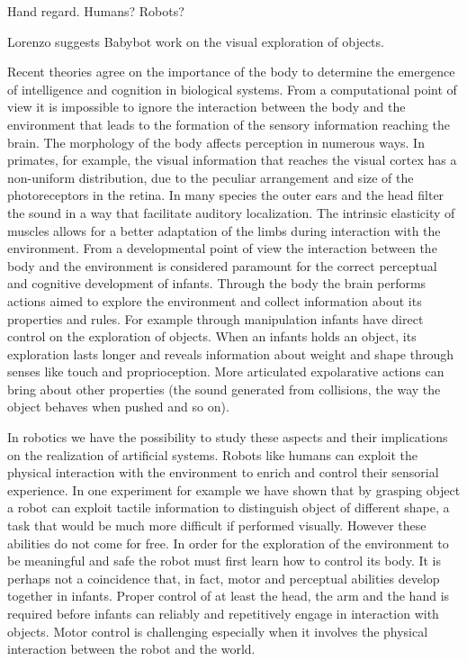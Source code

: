 
Hand regard.  Humans?  Robots?

Lorenzo suggests Babybot work on the visual exploration of objects.

Recent theories agree on the importance of the body to determine the emergence of intelligence and cognition in biological systems. 
From a computational point of view it is impossible to ignore the interaction between the body and the environment that leads to the formation of the sensory information reaching the brain. 
The morphology of the body affects perception in numerous ways. In primates, for example, the visual information that reaches the visual cortex has a non-uniform distribution, due to the peculiar arrangement and size of the photoreceptors in the retina. In many species the outer ears and the head filter the sound in a way that facilitate auditory localization. The intrinsic elasticity of muscles allows for a better adaptation of the limbs during interaction with the environment.
From a developmental point of view the interaction between the body and the environment is considered paramount for the correct perceptual and cognitive development of infants. 
Through the body the brain performs actions aimed to explore the environment and collect information about its properties and rules. For example through manipulation infants have direct control on the exploration of objects. When an infants holds an object, its exploration lasts longer and reveals information about weight and shape through senses like touch and proprioception. More articulated expolarative actions can bring about other properties (the sound generated from collisions, the way the object behaves when pushed and so on).

In robotics we have the possibility to study these aspects and their implications on the realization of artificial systems. Robots like humans can exploit the physical interaction with the environment to enrich and control their sensorial experience. In one experiment for example we have shown that by grasping object a robot can exploit tactile information to distinguish object of different shape, a task that would be much more difficult if performed visually.
However these abilities do not come for free. In order for the exploration of the environment to be meaningful and safe the robot must first learn how to control its body. It is perhaps not a coincidence that, in fact, motor and perceptual abilities develop together in infants. Proper control of at least the head, the arm and the hand is required before infants can reliably and repetitively engage in interaction with objects. Motor control is challenging especially when it involves the physical interaction between the robot and the world.

